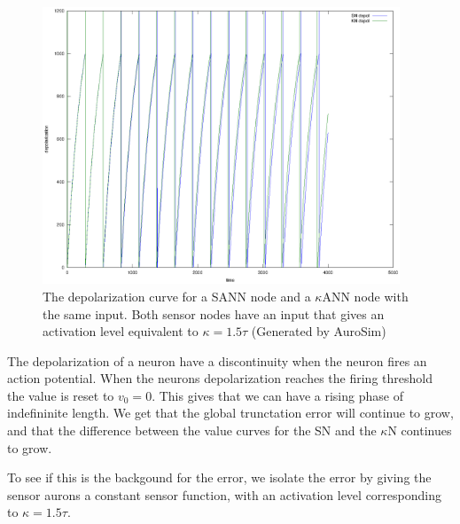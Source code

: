 \begin{figure}[hbt!]
	\centering
		\includegraphics[width=0.95\textwidth]{eps_comparison_between_KN_and_SN_ConstKappa.eps}
	\caption{The depolarization curve for a SANN node and a $\kappa$ANN node with the same input. Both sensor nodes have an input that gives an activation level equivalent to $\kappa = 1.5 \tau$ 
			(Generated by AuroSim)} %
	\label{figComparisonBetweenSsensorAndKsensorDepolCurveCONStActivityLevel}
\end{figure}

The depolarization of a neuron have a discontinuity when the neuron fires an action potential. 
When the neurons depolarization reaches the firing threshold the value is reset to $v_0 = 0$.
This gives that we can have a rising phase of indefininite length.
We get that the global trunctation error will continue to grow, and that the difference between the value curves for the SN and the $\kappa$N continues to grow.

To see if this is the backgound for the error, we isolate the error by giving the sensor aurons a constant sensor function, with an activation level corresponding to $\kappa = 1.5 \tau$.

